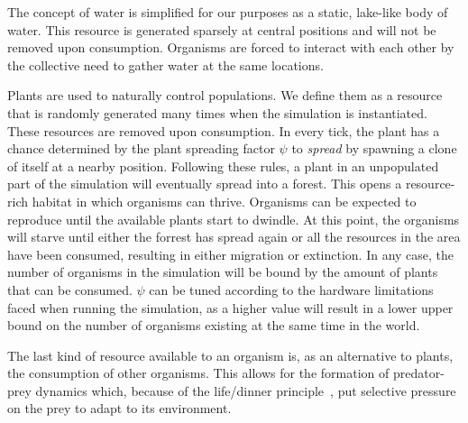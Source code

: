 The concept of water is simplified for our purposes as a static, lake-like body of water.
This resource is generated sparsely at central positions and will not be removed upon consumption.
Organisms are forced to interact with each other by the collective need to gather water at the same locations.

Plants are used to naturally control populations. We define them as a resource that is randomly generated
many times when the simulation is instantiated. These resources are removed upon consumption. In every tick, 
the plant has a chance determined by the plant spreading factor \(\psi \) to \emph{spread} by spawning a clone of itself
at a nearby position. Following these rules, a plant in an unpopulated part of the simulation will eventually spread 
into a forest.
This opens a resource-rich habitat in which organisms can thrive. Organisms can be expected to 
reproduce until the available plants start to dwindle. At this point, the organisms will starve until either 
the forrest has spread again or all the resources in the area have been consumed, resulting in either
migration or extinction. In any case, the number of organisms in the simulation will be bound by the amount of 
plants that can be consumed. 
\(\psi \) can be tuned according to the hardware limitations faced when running the simulation, as a higher value
will result in a lower upper bound on the number of organisms existing at the same time in the world.

The last kind of resource available to an organism is, as an alternative to plants, the consumption of 
other organisms. This allows for the formation of predator-prey dynamics which, 
because of the life/dinner principle~\cite{Dawkins1982}, put selective pressure on the prey to adapt to its 
environment.

